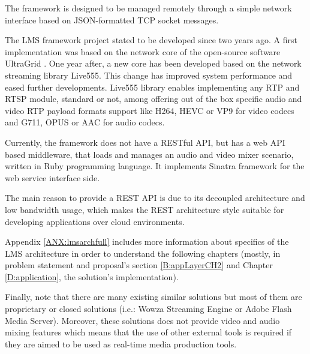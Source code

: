The framework is designed to be managed remotely through a simple network interface based on JSON-formatted TCP socket messages. 

The LMS framework project stated to be developed since two years ago. A first implementation was based on the network core of the open-source software UltraGrid \cite{ug}. One year after, a new core has been developed based on the network streaming library Live555. This change has improved system performance and eased further developments. Live555 library enables implementing any RTP and RTSP module, standard or not, among offering out of the box specific audio and video RTP payload formats support like H264, HEVC or VP9 for video codecs and G711, OPUS or AAC for audio codecs.

Currently, the framework does not have a RESTful API, but has a web API based middleware, that loads and manages an audio and video mixer scenario, written in Ruby programming language. It implements Sinatra framework for the web service interface side.

The main reason to provide a REST API is due to its decoupled architecture and low bandwidth usage, which makes the REST architecture style suitable for developing applications over cloud environments.

Appendix \ref{ANX:lmsarchfull} includes more information about specifics of the LMS architecture in order to understand the following chapters (mostly, in problem statement and proposal's section \ref{B:appLayerCH2} and Chapter \ref{D:application}, the solution's implementation).

Finally, note that there are many existing similar solutions but most of them are proprietary or closed solutions (i.e.: Wowza Streaming Engine or Adobe Flash Media Server). Moreover, these solutions does not provide video and audio mixing features which means that the use of other external tools is required if they are aimed to be used as real-time media production tools.
